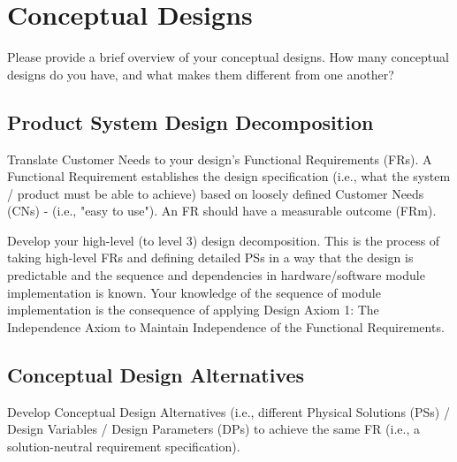 \documentclass{other/docTemplate}
\begin{document}
\clearpage
\section{Conceptual Designs}
Please provide a brief overview of your conceptual designs. How many conceptual designs do you have, and what makes them different from one another?



\subsection{Product System Design Decomposition}

Translate Customer Needs to your design’s Functional Requirements (FRs). 
A Functional Requirement establishes the design specification (i.e., what the system / product must be able to achieve) based on loosely defined Customer Needs (CNs) - (i.e., "easy to use").  
An FR should have a measurable outcome (FRm).

Develop your high-level (to level 3) design decomposition. 
This is the process of taking high-level FRs and defining detailed PSs in a way that the design is predictable and the sequence and dependencies in hardware/software module implementation is known. 
Your knowledge of the sequence of module implementation is the consequence of applying Design Axiom 1: The Independence Axiom to Maintain Independence of the Functional Requirements.



\subsection{Conceptual Design Alternatives}
Develop Conceptual Design Alternatives (i.e., different Physical Solutions (PSs) / Design Variables / Design Parameters (DPs) to achieve the same FR (i.e., a solution-neutral requirement specification).\\
\end{document}
